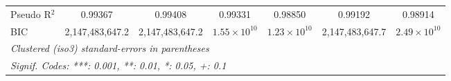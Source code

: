 \begin{tabular}{lcccccc}
   Pseudo R$^2$                                            & 0.99367         & 0.99408         & 0.99331               & 0.98850               & 0.99192         & 0.98914\\  
   BIC                                                     & 2,147,483,647.2 & 2,147,483,647.2 & $1.55\times 10^{10}$  & $1.23\times 10^{10}$  & 2,147,483,647.7 & $2.49\times 10^{10}$\\   
   \midrule \midrule
   \multicolumn{7}{l}{\emph{Clustered (iso3) standard-errors in parentheses}}\\
   \multicolumn{7}{l}{\emph{Signif. Codes: ***: 0.001, **: 0.01, *: 0.05, +: 0.1}}\\
\end{tabular}
\par\endgroup


